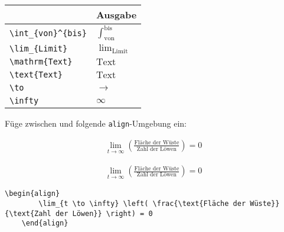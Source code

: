 \documentclass["WS\space 16-17\space -\space LaTeX-Kurs\space -\space Praesentation\space -\space 1.tex"]{subfiles}
\begin{document}
\begin{frame}[fragile]
	\begin{center}
		\begin{tabular}{ll}
			\toprule
			\color{math-cmd}{Mathe}\color{black}{-Befehl}							&	Ausgabe					\\ \midrule
			\lstinline|\int_{von}^{bis}|		&	$\int_{\text{von}}^{\text{bis}}$		\\ \addlinespace[0.5em]
			\lstinline|\lim_{Limit}|		&	$\lim_{\text{Limit}}$		\\
			\lstinline|\mathrm{Text}|		&	$\mathrm{Text}$		
      \\
			\lstinline|\text{Text}|		&	$\text{Text}$		
			\\
			\lstinline|\to|					&	$\to$		\\
			\lstinline|\infty|					&	$\infty$		\\
			\bottomrule
		\end{tabular}
	\end{center}
	\pause\btVFill
	\Aufgabee
		Füge zwischen  und  folgende \lstinline[basicstyle=\normalfont\normalsize]|align|-Umgebung ein:
	\begin{outputbox}
	    \begin{align}
		    \lim_{t \to \infty} \left( \frac{\text{Fläche der Wüste}}{\text{Zahl der Löwen}} \right) = 0 \tag{6}
	    \end{align}	
    \end{outputbox}
	\vspace{0.3cm}
\end{frame}
\begin{frame}[fragile]
	\Losung
	\begin{outputbox}
	    \begin{align}
	      \lim_{t \to \infty} \left( \frac{\text{Fläche der Wüste}}{\text{Zahl der Löwen}} \right) = 0 \tag{6}
	    \end{align}
	\end{outputbox}

	\Code
	\begin{lstlisting}[gobble=4]
    \begin{align}
        \lim_{t \to \infty} \left( \frac{\text{Fläche der Wüste}}{\text{Zahl der Löwen}} \right) = 0
    \end{align}
	\end{lstlisting}
\end{frame}
\end{document}
